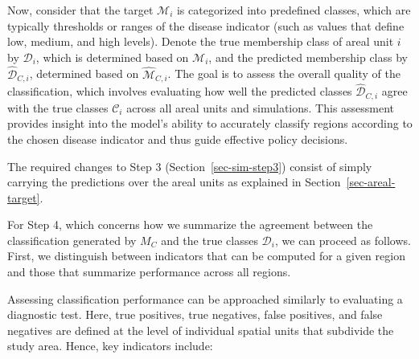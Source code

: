 \documentclass[
  letterpaper,
]{krantz}
\begin{document}
Now, consider that the target \(\mathcal{M}_i\) is categorized into
predefined classes, which are typically thresholds or ranges of the
disease indicator (such as values that define low, medium, and high
levels). Denote the true membership class of areal unit \(i\) by
\(\mathcal{D}_i\), which is determined based on \(\mathcal{M}_i\), and
the predicted membership class by \(\hat{\mathcal{D}}_{C,i}\),
determined based on \(\hat{\mathcal{M}}_{C,i}\). The goal is to assess
the overall quality of the classification, which involves evaluating how
well the predicted classes \(\hat{\mathcal{D}}_{C,i}\) agree with the
true classes \(\mathcal{C}_i\) across all areal units and simulations.
This assessment provides insight into the model's ability to accurately
classify regions according to the chosen disease indicator and thus
guide effective policy decisions.

The required changes to Step 3 (Section~\ref{sec-sim-step3}) consist of
simply carrying the predictions over the areal units as explained in
Section~\ref{sec-areal-target}.

For Step 4, which concerns how we summarize the agreement between the
classification generated by \(M_C\) and the true classes
\(\mathcal{D}_i\), we can proceed as follows. First, we distinguish
between indicators that can be computed for a given region and those
that summarize performance across all regions.

Assessing classification performance can be approached similarly to
evaluating a diagnostic test. Here, true positives, true negatives,
false positives, and false negatives are defined at the level of
individual spatial units that subdivide the study area. Hence, key
indicators include:
\end{document}
